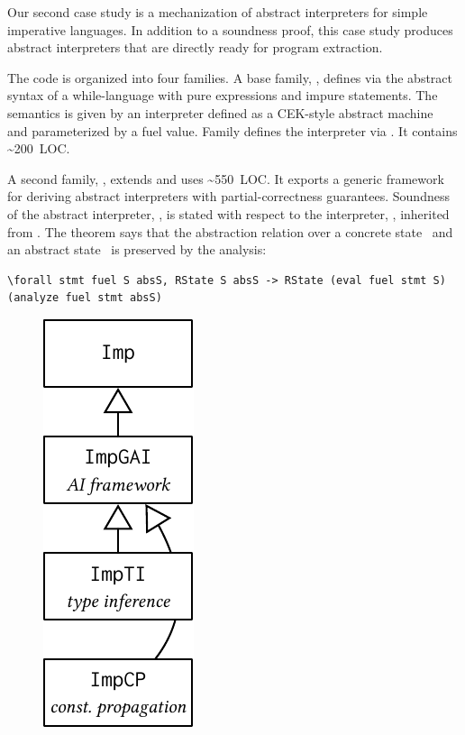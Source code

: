 
Our second case study is a mechanization of abstract interpreters
for simple imperative languages.
In addition to a soundness proof, this case study produces abstract
interpreters that are directly ready for program extraction.

The code is organized into four families.
A base family, , defines via  the abstract
syntax of a while-language with pure expressions and impure statements.
The semantics is given by an interpreter defined as a CEK-style abstract
machine~\cite{felleisen1986control} and parameterized by a fuel value.
Family  defines the interpreter via .
It contains \textasciitilde 200~LOC.

A second family, , extends  and uses
\textasciitilde 550~LOC.
It exports a generic framework for deriving
abstract interpreters with partial-correctness guarantees.
Soundness of the abstract interpreter, ,
is stated with respect to the interpreter, , inherited from .
The theorem says that the abstraction relation  over a
concrete state~ and an abstract state~ is preserved
by the analysis:

\begin{centered}
\begin{minipage}{.91\textwidth}
\begin{lstlisting}[basicstyle=\fontsize{8.25}{9}\ttfamily]
\forall stmt fuel S absS, RState S absS -> RState (eval fuel stmt S) (analyze fuel stmt absS)
\end{lstlisting}
\end{minipage}
\end{centered}

\begin{figure}
\includegraphics[scale=.68]{graphics/ai-casestudy.pdf}
\end{figure}


